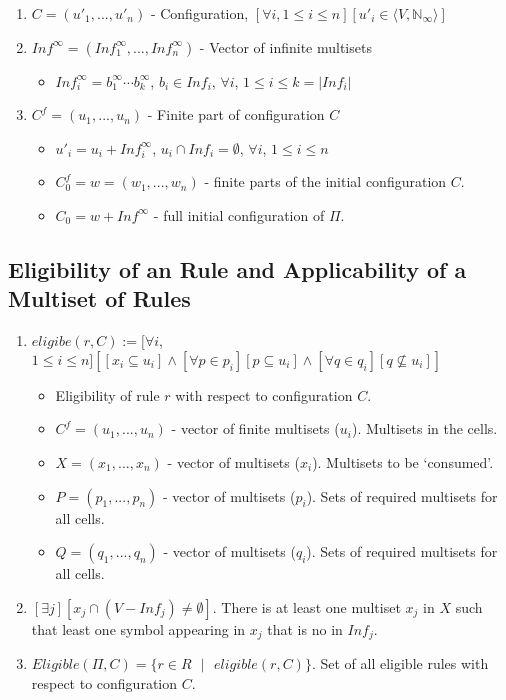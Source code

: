 \documentclass{article}
\newcommand{\s}{\text{ }}
\newcommand{\la}{\langle}
\newcommand{\ra}{\rangle}
\begin{document}
\begin{enumerate}
   \item $C = (u'_1,...,u'_n)$ - Configuration, $[\forall i, 1\leq i\leq n][u'_i \in \la V, 
         \mathbb{N}_{\infty}\ra]$
   \item $Inf^{\infty} = (Inf_1^{\infty},...,Inf_n^{\infty})$ - Vector of infinite multisets
         \begin{itemize}
         \item $Inf^{\infty}_i = b_1^{\infty}\cdots b_k^{\infty}$, $b_i \in Inf_i$, $\forall i$, $1
               \leq i \leq k = |Inf_i|$ 
         \end{itemize}
   \item $C^{f} = (u_1,...,u_n)$ - Finite part of configuration $C$
         \begin{itemize}
         \item $u'_i = u_i + Inf_i^{\infty}$, $u_i \cap Inf_i = \emptyset$, $\forall i$, $1 \leq i 
               \leq n$ 
         \item $C^f_0 = w = (w_1,...,w_n)$ - finite parts of the initial configuration $C$.
         \item $C_0 = w + Inf^{\infty}$ - full initial configuration of $\Pi$.
         \end{itemize}

\end{enumerate}

\subsection{Eligibility of an Rule and Applicability of a Multiset of Rules}

\begin{enumerate}
   \item $eligibe(r,C) := [\forall i$, $1 \leq i \leq n][[x_i \subseteq u_i ] \land 
         [\forall p \in p_i][p \subseteq u_i] \land [\forall q \in q_i][q \not\subseteq u_i]]$
         \begin{itemize}
         \item Eligibility of rule $r$ with respect to configuration $C$.
         \item $C^f = (u_1,...,u_n)$ - vector of finite multisets ($u_i$). Multisets in the cells.
         \item $X = (x_1,...,x_n)$ - vector of multisets ($x_i$). Multisets to be `consumed'.
         \item $P = (p_1,...,p_n)$ - vector of multisets ($p_i$). Sets of required multisets for all 
               cells.
         \item $Q = (q_1,...,q_n)$ - vector of multisets ($q_i$). Sets of required multisets for all 
               cells.
         \end{itemize}
   \item $[\exists j][x_j \cap (V - Inf_j) \neq \emptyset]$. There is at least one multiset $x_j$ in 
         $X$  such that least one symbol appearing in $x_j$ that is no in $Inf_j$.
   \item $Eligible(\Pi, C) = \{r \in R\s |\s eligible(r,C)\}$. Set of all eligible rules with
         respect to configuration $C$.
\end{enumerate}
\end{document}
